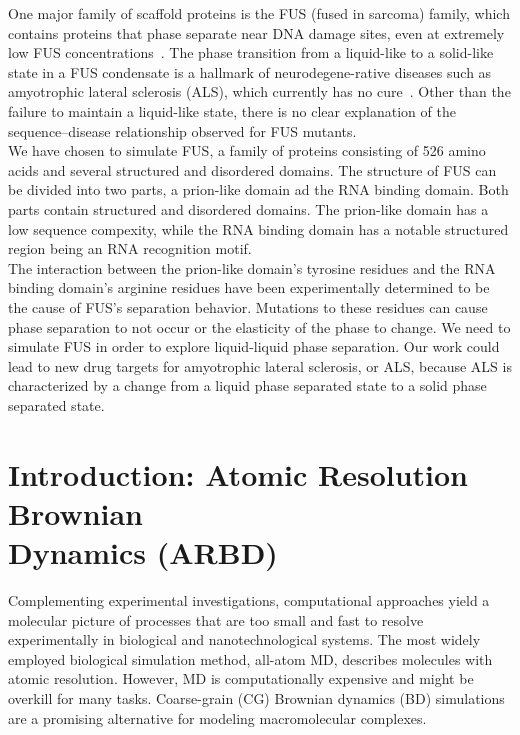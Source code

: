 \documentclass[letterpaper]{article}
\begin{document}
One major family of scaffold proteins is the FUS (fused in sarcoma) family, which contains proteins that phase separate near DNA damage sites, even at extremely low FUS concentrations~\cite{MAST2013,WANG2018A,LIN2015,YU2015}. The phase transition from a liquid-like to a solid-like state in a FUS condensate is a hallmark of neurodegene-rative diseases such as amyotrophic lateral sclerosis (ALS), which currently has no cure~\cite{MOLL2015,PATE2015}. 
Other than the failure to maintain a liquid-like state, there is no clear explanation of the sequence--disease relationship observed for FUS mutants.\\[0.1cm]

We have chosen to simulate FUS, a family of proteins consisting of 526 amino acids and several structured and disordered domains. The structure of FUS can be divided into two parts, a prion-like domain ad the RNA binding domain. Both parts contain structured and disordered domains. The prion-like domain has a low sequence compexity, while the RNA binding domain has a notable structured region being an RNA recognition motif. \\[0.02cm]

The interaction between the prion-like domain's tyrosine residues and the RNA binding domain's arginine residues have been experimentally determined to be the cause of FUS's separation behavior. Mutations to these residues can cause phase separation to not occur or the elasticity of the phase to change.  We need to simulate FUS in order to explore liquid-liquid phase separation. Our work could lead to new drug targets for amyotrophic lateral sclerosis, or ALS, because ALS is characterized by a change from a liquid phase separated state to a solid phase separated state.

\newpage
\section{Introduction: Atomic Resolution Brownian \\ Dynamics (ARBD)}
Complementing experimental investigations, computational approaches yield a molecular picture of processes that are too small and fast to resolve experimentally in biological and nanotechnological systems. The most widely employed biological simulation method, all-atom MD, describes molecules with atomic resolution. However, MD is computationally expensive and might be overkill for many tasks. Coarse-grain (CG) Brownian dynamics (BD) simulations are a promising alternative for modeling macromolecular complexes.\\[0.02cm]
\end{document}
